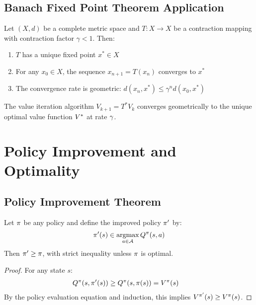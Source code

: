 \subsection{Banach Fixed Point Theorem Application}

\begin{theorem}
Let $(X, d)$ be a complete metric space and $T: X \to X$ be a contraction mapping with contraction factor $\gamma < 1$. Then:
\begin{enumerate}
    \item $T$ has a unique fixed point $x^* \in X$
    \item For any $x_0 \in X$, the sequence $x_{n+1} = T(x_n)$ converges to $x^*$
    \item The convergence rate is geometric: $d(x_n, x^*) \leq \gamma^n d(x_0, x^*)$
\end{enumerate}
\end{theorem}

\begin{corollary}
The value iteration algorithm $V_{k+1} = T^* V_k$ converges geometrically to the unique optimal value function $V^*$ at rate $\gamma$.
\end{corollary}

\section{Policy Improvement and Optimality}

\subsection{Policy Improvement Theorem}

\begin{theorem}
Let $\pi$ be any policy and define the improved policy $\pi'$ by:
\begin{equation}
\pi'(s) \in \operatorname*{argmax}_{a \in \mathcal{A}} Q^\pi(s,a)
\end{equation}
Then $\pi' \geq \pi$, with strict inequality unless $\pi$ is optimal.
\end{theorem}

\begin{proof}
For any state $s$:
\begin{align}
Q^\pi(s, \pi'(s)) &\geq Q^\pi(s, \pi(s)) = V^\pi(s)
\end{align}
By the policy evaluation equation and induction, this implies $V^{\pi'}(s) \geq V^\pi(s)$.
\end{proof}

